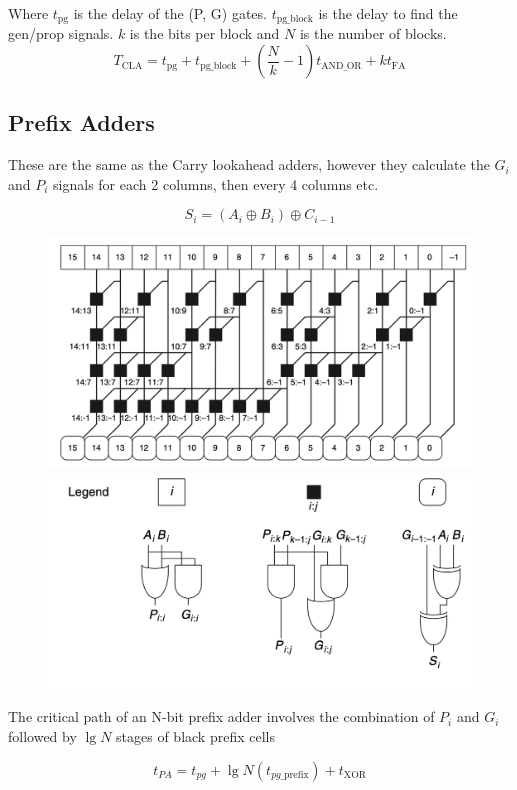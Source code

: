 \documentclass[12pt]{report}
\begin{document}
\noindent Where $t_{\mathrm{pg}}$ is the delay of the (P, G) gates. $t_{\mathrm{pg\_block}}$ is the delay to find the gen/prop signals. $k$ is the bits per block and $N$ is the number of blocks.
\[
  T_{\mathrm{CLA}} = t_{\mathrm{pg}} + t_{\mathrm{pg\_block}} + \left( \frac{N}{k} - 1 \right)t_{\mathrm{AND\_OR}} + kt_{\mathrm{FA}}
\]

\subsection{Prefix Adders}
These are the same as the Carry lookahead adders, however they calculate the $G_i$ and $P_i$ signals for each 2 columns, then every 4 columns etc.

\[
  {S}_{i}=(A_{i}\oplus B_{i})\oplus{C}_{i-1}
\]

\begin{figure}[h!]
  \centering
  \includegraphics[width=.9\textwidth]{prefix_adder_schematic.png}
  \includegraphics[width=.9\textwidth]{prefix_schematic_legend.png}
\end{figure}

The critical path of an N-bit prefix adder involves the combination of $P_i$ and $G_i$ followed by $\lg N$ stages of black prefix cells

\[
  t_{PA} = t_{pg} + \lg N \left( t_{pg \_ \mathrm{prefix}} \right) + t_{\mathrm{XOR}}
\]
\pagebreak
\end{document}
